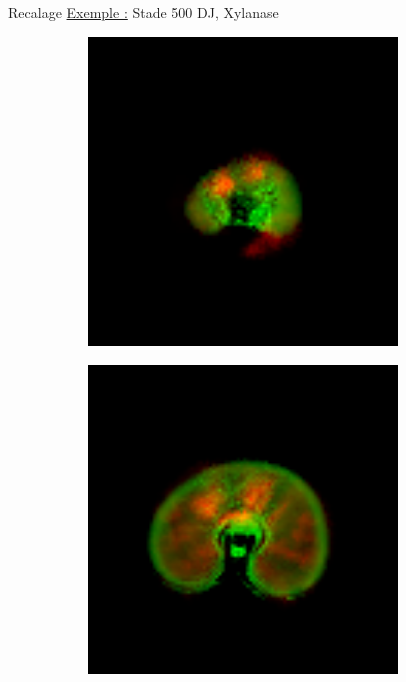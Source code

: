 \documentclass[10pt]{beamer}
\begin{document}
\begin{frame}{Recalage}
\underline{Exemple :} Stade 500 DJ, Xylanase
  \begin{figure}[ht]
    \centering
    \begin{subfigure}[t]{0.33\textwidth}
      \centering
      \includegraphics[width=0.9\textwidth]{fig/recalage_500Xyl_0}
      \caption{}
      \label{subfig:recalage_500Xyl_0}
    \end{subfigure}%
    \begin{subfigure}[t]{0.33\textwidth}
      \centering
      \includegraphics[width=0.9\textwidth]{fig/recalage_500Xyl_2}

\end{subfigure}
\end{figure}
\end{frame}
\end{document}
